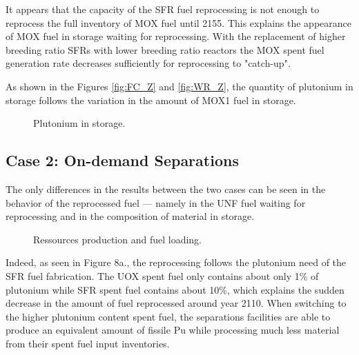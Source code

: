 \documentclass[12pt]{article}
\begin{document}
It appears that the capacity of the SFR fuel reprocessing is not enough to
reprocess the full inventory of MOX fuel until 2155. This explains the
appearance of MOX fuel in storage waiting for reprocessing. With the
replacement of higher breeding ratio SFRs with lower breeding ratio reactors
the MOX spent fuel generation rate decreases sufficiently for reprocessing to
"catch-up".

As shown in the Figures \ref{fig:FC_Z} and \ref{fig:WR_Z}, the quantity of
plutonium in storage follows the variation in the amount of MOX1 fuel in
storage.

\begin{figure}[h!]
    \centering
    \caption{Plutonium in storage.\label{fig:FC_WR_zoom} }
\end{figure}

\subsection{Case 2: On-demand Separations}

The only differences in the results between the two cases can be seen in the
behavior of the reprocessed fuel --- namely in the UNF fuel waiting for
reprocessing and in the composition of material in storage.

\begin{figure}[h!]
    \centering
    \caption{Ressources production and fuel loading.\label{fig:ARR_FWR_SFC_2} }
\end{figure}

Indeed, as seen in Figure 8a., the reprocessing follows the plutonium need of
the SFR fuel fabrication. The UOX spent fuel only contains about only 1\% of
plutonium while SFR spent fuel contains about 10\%, which explains the sudden
decrease in the amount of fuel reprocessed around year 2110.  When switching
to the higher plutonium content spent fuel, the separations facilities are
able to produce an equivalent amount of fissile Pu while processing much less
material from their spent fuel input inventories.
\end{document}
